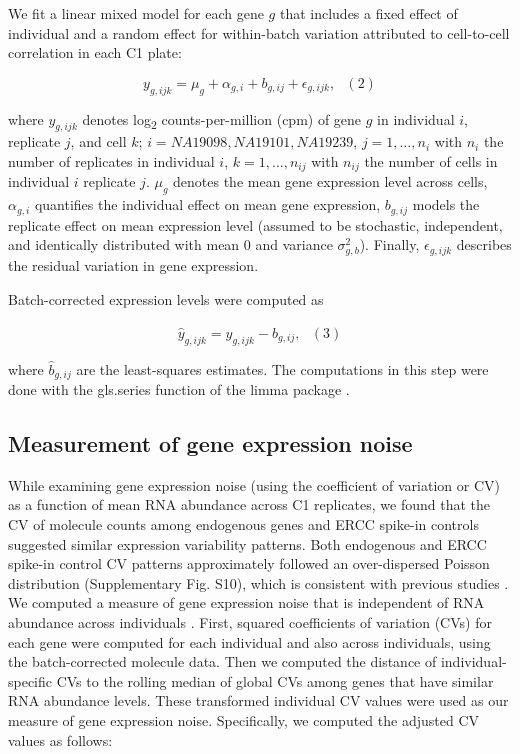 We fit a linear mixed model for each gene $g$ that includes a fixed
effect of individual and a random effect for within-batch variation
attributed to cell-to-cell correlation in each C1 plate:

\[ y_{g,ijk} = \mu_{g} + \alpha_{g,i} + b_{g,ij} + \epsilon_{g,ijk}, \,\,\,\,(2)\]

where $y_{g,ijk}$ denotes log\textsubscript{2} counts-per-million (cpm)
of gene $g$ in individual $i$, replicate $j$, and cell $k$;
$i = NA19098, NA19101, NA19239$, $j = 1, \dots, n_i$ with $n_i$ the
number of replicates in individual $i$, $k = 1, \dots, n_{ij}$ with
$n_{ij}$ the number of cells in individual $i$ replicate $j$. $\mu_g$
denotes the mean gene expression level across cells, $\alpha_{g,i}$
quantifies the individual effect on mean gene expression, $b_{g,ij}$
models the replicate effect on mean expression level (assumed to be
stochastic, independent, and identically distributed with mean 0 and
variance $\sigma^2_{g,b}$). Finally, $\epsilon_{g,ijk}$ describes the
residual variation in gene expression.

Batch-corrected expression levels were computed as

\[ \widehat{y}_{g,ijk} = y_{g,ijk} - \widehat{b}_{g,ij}, \,\,\,\,(3)\]

where $\widehat{b}_{g,ij}$ are the least-squares estimates. The
computations in this step were done with the gls.series function of the
limma package \citep{limma}.

\subsection{Measurement of gene expression
noise}\label{measurement-of-gene-expression-noise}

While examining gene expression noise (using the coefficient of
variation or CV) as a function of mean RNA abundance across C1
replicates, we found that the CV of molecule counts among endogenous
genes and ERCC spike-in controls suggested similar expression
variability patterns. Both endogenous and ERCC spike-in control CV
patterns approximately followed an over-dispersed Poisson distribution
(Supplementary Fig. S10), which is consistent with previous studies
\citep{Islam2014, Brennecke2013}. We computed a measure of gene
expression noise that is independent of RNA abundance across individuals
\citep{Kolodziejczyk2015, Newman2006}. First, squared coefficients of
variation (CVs) for each gene were computed for each individual and also
across individuals, using the batch-corrected molecule data. Then we
computed the distance of individual-specific CVs to the rolling median
of global CVs among genes that have similar RNA abundance levels. These
transformed individual CV values were used as our measure of gene
expression noise. Specifically, we computed the adjusted CV values as
follows:

